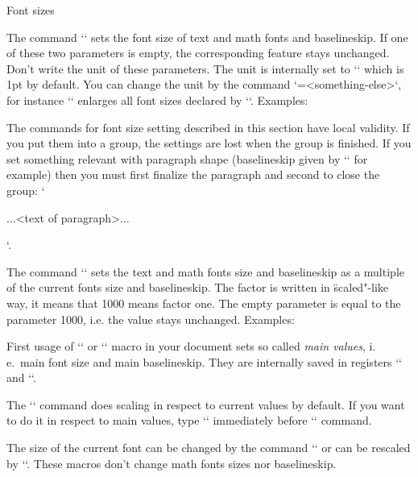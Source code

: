 \secc[sizes] Font sizes

The command `` sets the font size of text and
math fonts and baselineskip. If one of these two parameters is empty, the
corresponding feature stays unchanged. Don't write the unit of these
parameters. The unit is internally set to `\ptunit` which is 1pt by default.
You can change the unit by the command `\ptunit=<something-else>`, 
for instance `\ptunit=1mm` enlarges all font sizes declared by `\typosize`.
Examples:

\begtt
\typosize[10/12]   %
\typosize[11/12.5] %
\typosize[8/]      %
\endtt

The commands for font size setting described in this section
have local validity. If you put them into a group, 
the settings are lost when the group is finished. If you set 
something relevant with paragraph shape (baselineskip given by 
`\typosize` for example) then you must first finalize the 
paragraph and second to close the group: 
`{\typosize[12/14] ...<text of paragraph>... \par}`. 

The command
``
sets the text and math fonts
size and baselineskip as a multiple of the current fonts size and
baselineskip. The factor is written in \"scaled"-like way, it means that 1000
means factor one. The empty parameter is equal to the parameter 1000,
i.e. the value stays unchanged. Examples:

\begtt
\typoscale[800/800]    %
\typoscale[\magstep2/] %
\endtt

First usage of `\typosize` or `\typoscale` macro in your document sets so
called {\em main values}, i.\,e.\ main font size and main baselineskip. They are internally 
saved in registers `\mainfosize` and `\mainbaselineskip`. 

\new
The `\typoscale` command does scaling in respect to current values by default. 
If you want to do it in respect to main values, type `\scalemain` immediately
before `\typoscale` command.

\begtt
\typosize[12/14.4] %
\typosize[15/18]   %
\scalemain \typoscale[800/800] %
\endtt

The size of the current font can be changed by the command
`` or can be rescaled by
`\thefontscale[<factor>]`. These macros don't change math fonts sizes nor
baselineskip.

